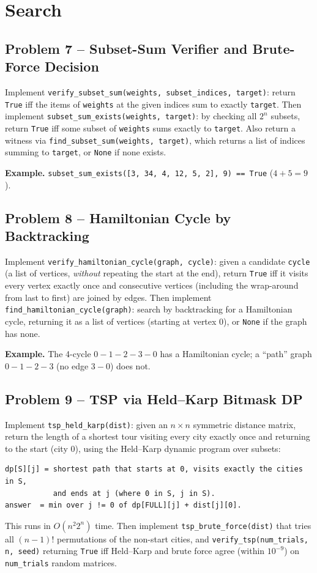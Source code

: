 \documentclass[11pt]{article}
\begin{document}
\newpage
\section{Search}

\subsection*{Problem 7 -- Subset-Sum Verifier and Brute-Force Decision}

Implement \texttt{verify\_subset\_sum(weights, subset\_indices, target)}: return
\texttt{True} iff the items of \texttt{weights} at the given indices sum to exactly
\texttt{target}. Then implement \texttt{subset\_sum\_exists(weights, target)}: by checking
all $2^n$ subsets, return \texttt{True} iff some subset of \texttt{weights} sums exactly to
\texttt{target}. Also return a witness via
\texttt{find\_subset\_sum(weights, target)}, which returns a list of indices summing to
\texttt{target}, or \texttt{None} if none exists.

\textbf{Example.} \texttt{subset\_sum\_exists([3, 34, 4, 12, 5, 2], 9) == True}
($4 + 5 = 9$).

\subsection*{Problem 8 -- Hamiltonian Cycle by Backtracking}

Implement \texttt{verify\_hamiltonian\_cycle(graph, cycle)}: given a candidate
\texttt{cycle} (a list of vertices, \emph{without} repeating the start at the end), return
\texttt{True} iff it visits every vertex exactly once and consecutive vertices (including
the wrap-around from last to first) are joined by edges. Then implement
\texttt{find\_hamiltonian\_cycle(graph)}: search by backtracking for a Hamiltonian cycle,
returning it as a list of vertices (starting at vertex 0), or \texttt{None} if the graph
has none.

\textbf{Example.} The 4-cycle $0\!-\!1\!-\!2\!-\!3\!-\!0$ has a Hamiltonian cycle; a
``path'' graph $0\!-\!1\!-\!2\!-\!3$ (no edge $3\!-\!0$) does not.

\subsection*{Problem 9 -- TSP via Held--Karp Bitmask DP}

Implement \texttt{tsp\_held\_karp(dist)}: given an $n \times n$ symmetric distance matrix,
return the length of a shortest tour visiting every city exactly once and returning to the
start (city 0), using the Held--Karp dynamic program over subsets:
\begin{verbatim}
dp[S][j] = shortest path that starts at 0, visits exactly the cities in S,
           and ends at j (where 0 in S, j in S).
answer  = min over j != 0 of dp[FULL][j] + dist[j][0].
\end{verbatim}
This runs in $O(n^2 2^n)$ time. Then implement \texttt{tsp\_brute\_force(dist)} that tries
all $(n-1)!$ permutations of the non-start cities, and
\texttt{verify\_tsp(num\_trials, n, seed)} returning \texttt{True} iff Held--Karp and brute
force agree (within $10^{-9}$) on \texttt{num\_trials} random matrices.
\end{document}
